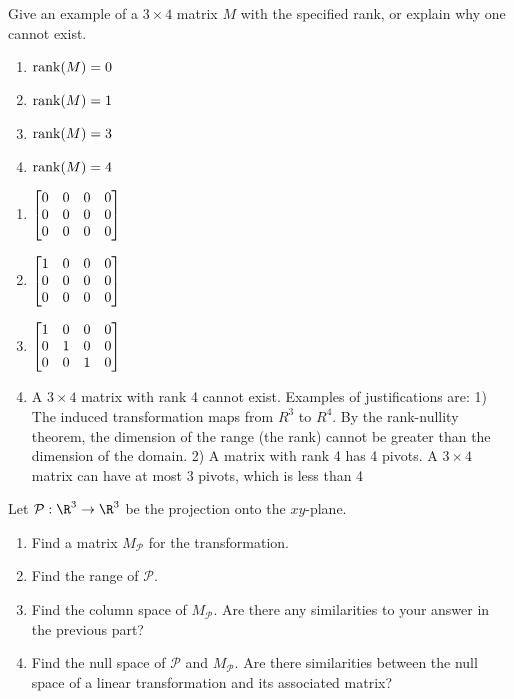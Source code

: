 \begin{exercises}
\begin{problist}
		\prob Give an example of a $3\times4$ matrix $M$ with the specified rank, or explain why one cannot exist.
		\begin{enumerate}
			\item $\operatorname{rank}(M) = 0$
			\item $\operatorname{rank}(M) = 1$
			\item $\operatorname{rank}(M) = 3$
			\item $\operatorname{rank}(M) = 4$
		\end{enumerate}

		\begin{solution}
			\begin{enumerate}
				\item $\mat{0&0&0&0\\0&0&0&0\\0&0&0&0}$

				\item $\mat{1&0&0&0\\0&0&0&0\\0&0&0&0}$

				\item $\mat{1&0&0&0\\0&1&0&0\\0&0&1&0}$

				\item A $3\times4$ matrix with rank 4 cannot exist. Examples of justifications
					are: 1) The induced transformation maps from $R^{3}$ to $R^{4}$. By
					the rank-nullity theorem, the dimension of the range (the rank) cannot
					be greater than the dimension of the domain. 2) A matrix with rank 4
					has 4 pivots. A $3\times4$ matrix can have at most 3 pivots, which is
					less than 4
			\end{enumerate}
		\end{solution}

		\prob Let $\mathcal{P}:\R^3\to\R^3$ be the projection onto the $xy$-plane.
		\begin{enumerate}
			\item Find a matrix $M_\mathcal{P}$ for the transformation.
			\item Find the range of $\mathcal{P}$.
			\item Find the column space of $M_\mathcal{P}$. Are there any similarities to your answer in the previous part?
			\item Find the null space of $\mathcal{P}$ and $M_\mathcal{P}$. Are there similarities between the null space of a linear transformation and its associated matrix?
		\end{enumerate}


\end{problist}
\end{exercises}
